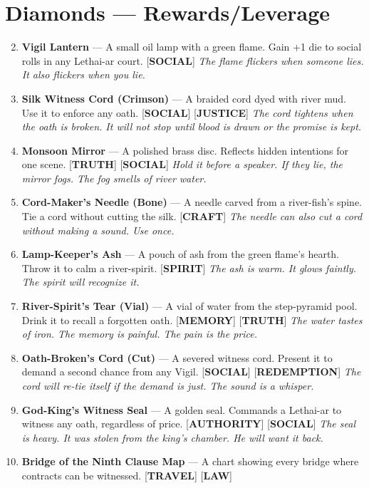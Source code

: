 \section*{Diamonds --- Rewards/Leverage}
\label{sec:lethai-ar-rewards-revised}
\begin{enumerate}
\setcounter{enumi}{1}
\item \textbf{Vigil Lantern} --- A small oil lamp with a green flame. Gain +1 die to social rolls in any Lethai-ar court. [\textbf{SOCIAL}]
  \hfill \textit{The flame flickers when someone lies. It also flickers when you lie.}
\item \textbf{Silk Witness Cord (Crimson)} --- A braided cord dyed with river mud. Use it to enforce any oath. [\textbf{SOCIAL}] [\textbf{JUSTICE}]
  \hfill \textit{The cord tightens when the oath is broken. It will not stop until blood is drawn or the promise is kept.}
\item \textbf{Monsoon Mirror} --- A polished brass disc. Reflects hidden intentions for one scene. [\textbf{TRUTH}] [\textbf{SOCIAL}]
  \hfill \textit{Hold it before a speaker. If they lie, the mirror fogs. The fog smells of river water.}
\item \textbf{Cord-Maker's Needle (Bone)} --- A needle carved from a river-fish's spine. Tie a cord without cutting the silk. [\textbf{CRAFT}]
  \hfill \textit{The needle can also cut a cord without making a sound. Use once.}
\item \textbf{Lamp-Keeper's Ash} --- A pouch of ash from the green flame's hearth. Throw it to calm a river-spirit. [\textbf{SPIRIT}]
  \hfill \textit{The ash is warm. It glows faintly. The spirit will recognize it.}
\item \textbf{River-Spirit's Tear (Vial)} --- A vial of water from the step-pyramid pool. Drink it to recall a forgotten oath. [\textbf{MEMORY}] [\textbf{TRUTH}]
  \hfill \textit{The water tastes of iron. The memory is painful. The pain is the price.}
\item \textbf{Oath-Broken's Cord (Cut)} --- A severed witness cord. Present it to demand a second chance from any Vigil. [\textbf{SOCIAL}] [\textbf{REDEMPTION}]
  \hfill \textit{The cord will re-tie itself if the demand is just. The sound is a whisper.}
\item \textbf{God-King's Witness Seal} --- A golden seal. Commands a Lethai-ar to witness any oath, regardless of price. [\textbf{AUTHORITY}] [\textbf{SOCIAL}]
  \hfill \textit{The seal is heavy. It was stolen from the king's chamber. He will want it back.}
\item \textbf{Bridge of the Ninth Clause Map} --- A chart showing every bridge where contracts can be witnessed. [\textbf{TRAVEL}] [\textbf{LAW}]

\end{enumerate}
